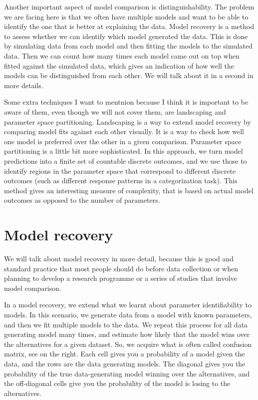 \documentclass[12pt]{article}
\begin{document}
Another important aspect of model comparison is distinguishability. The problem we are facing here is that we often have multiple models and want to be able to identify the one that is better at explaining the data. Model recovery is a method to assess whether we can identify which model generated the data. This is done by simulating data from each model and then fitting the models to the simulated data. Then we can count how many times each model came out on top when fitted against the simulated data, which gives an indication of how well the models can be distinguished from each other. We will talk about it in a second in more details.

Some extra techniques I want to mentnion because I think it is important to be aware of them, even though we will not cover them, are landscaping and parameter space partitioning. Landscaping is a way to extend model recovery by comparing model fits against each other visually. It is a way to check how well one model is preferred over the other in a given comparison. Parameter space partitioning is a little bit more sophisticated. In this approach, we turn model predictions into a finite set of countable discrete outcomes, and we use those to identify regions in the parameter space that correspond to different discrete outcomes (such as different response patterns in a categorization task). This method gives an interesting measure of complexity, that is based on actual model outcomes as opposed to the number of parameters.

\section{Model recovery}

We will talk about model recovery in more detail, because this is good and standard practice that most people should do before data collection or when planning to develop a research programme or a series of studies that involve model comparison.

In a model recovery, we extend what we learnt about parameter identifiability to models. In this scenario, we generate data from a model with known parameters, and then we fit multiple models to the data. We repeat this process for all data generating model many times, and estimate how likely that the model wins over the alternatives for a given dataset. So, we acquire what is often called confusion matrix, see on the right. Each cell gives you a probability of a model given the data, and the rows are the data generating models. The diagonal gives you the probability of the true data-generating model winning over the alternatives, and the off-diagonal cells give you the probability of the model is losing to the alternatives.
\end{document}
